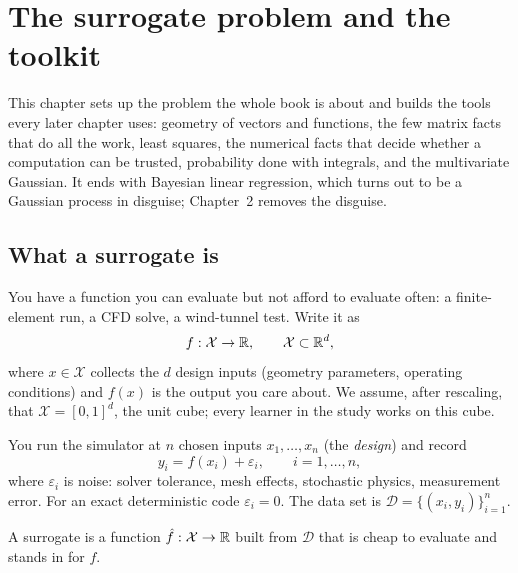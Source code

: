 \chapter{The surrogate problem and the toolkit}
\label{ch:toolkit}

This chapter sets up the problem the whole book is about and builds the tools every later chapter uses: geometry of
vectors and functions, the few matrix facts that do all the work, least squares, the numerical facts that decide
whether a computation can be trusted, probability done with integrals, and the multivariate Gaussian. It ends with
Bayesian linear regression, which turns out to be a Gaussian process in disguise; Chapter~2 removes the disguise.

\section{What a surrogate is}

You have a function you can evaluate but not afford to evaluate often: a finite-element run, a CFD solve, a
wind-tunnel test. Write it as
\begin{equation}
  f : \mathcal{X} \to \mathbb{R}, \qquad \mathcal{X} \subset \mathbb{R}^d ,
\end{equation}
where $x \in \mathcal{X}$ collects the $d$ design inputs (geometry parameters, operating conditions) and $f(x)$ is
the output you care about. We assume, after rescaling, that $\mathcal{X} = [0,1]^d$, the unit cube; every learner in
the study works on this cube.

You run the simulator at $n$ chosen inputs $x_1, \dots, x_n$ (the \emph{design}) and record
\begin{equation}
  y_i = f(x_i) + \varepsilon_i , \qquad i = 1, \dots, n,
  \label{eq:data}
\end{equation}
where $\varepsilon_i$ is noise: solver tolerance, mesh effects, stochastic physics, measurement error. For an exact
deterministic code $\varepsilon_i = 0$. The data set is $\mathcal{D} = \{(x_i, y_i)\}_{i=1}^n$.

\begin{definition}[Surrogate]
A surrogate is a function $\hat f : \mathcal{X} \to \mathbb{R}$ built from $\mathcal{D}$ that is cheap to evaluate and
stands in for $f$.
\end{definition}

